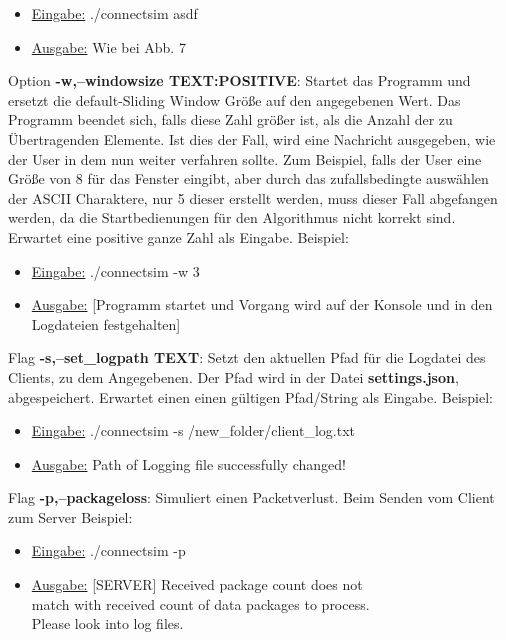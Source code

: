 \documentclass{article}
\begin{document}
\begin{itemize}
	\item \underline{Eingabe:} ./connectsim asdf
	\item \underline{Ausgabe:} Wie bei Abb. 7\newline 
\end{itemize}

Option \textbf{-w,--windowsize TEXT:POSITIVE}:\newline
Startet das Programm und ersetzt die default-Sliding Window Größe auf den angegebenen Wert. Das Programm beendet sich, falls diese Zahl größer ist, als die Anzahl der zu Übertragenden Elemente. Ist dies der Fall, wird eine Nachricht ausgegeben, wie der User in dem nun weiter verfahren sollte. Zum Beispiel, falls der User eine Größe von 8 für das Fenster eingibt, aber durch das zufallsbedingte auswählen der ASCII Charaktere, nur 5 dieser erstellt werden, muss dieser Fall abgefangen werden, da die Startbedienungen für den Algorithmus nicht korrekt sind.\\
Erwartet eine positive ganze Zahl als Eingabe.
Beispiel: 
\begin{itemize}
	\item \underline{Eingabe:} ./connectsim -w 3
	\item \underline{Ausgabe:} [Programm startet und Vorgang wird auf der Konsole und in den Logdateien festgehalten]
\end{itemize}

\break

Flag \textbf{-s,--set\_logpath TEXT}:\newline
Setzt den aktuellen Pfad für die Logdatei des Clients, zu dem Angegebenen. Der Pfad wird in der Datei \textbf{settings.json}, abgespeichert.
Erwartet einen einen gültigen Pfad/String als Eingabe.
Beispiel: 
\begin{itemize}
	\item \underline{Eingabe:} ./connectsim -s /new\_folder/client\_log.txt
	\item \underline{Ausgabe:} 
Path of Logging file successfully changed!\\
\end{itemize}

Flag \textbf{-p,--packageloss}:\newline
Simuliert einen Packetverlust. Beim Senden vom Client zum Server
Beispiel: 
\begin{itemize}
	\item \underline{Eingabe:} ./connectsim -p
	\item \underline{Ausgabe:} [SERVER] Received package count does not\\ match with received count of data packages to process.
	\\ Please look into log files.\\
\end{itemize}
\end{document}
